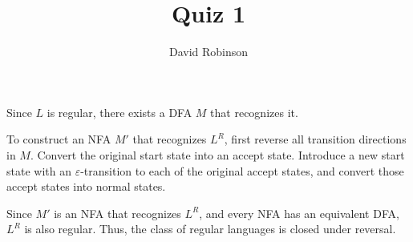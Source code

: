 \documentclass{article}
\title{Quiz 1}
\author{David Robinson}
\date{}
\begin{document}
\maketitle

Since $L$ is regular, there exists a DFA $M$ that recognizes it.
\vspace{1em}

To construct an NFA $M'$ that recognizes $L^R$, first reverse all transition directions in $M$. Convert the original start state into an accept state. Introduce a new start state with an $\varepsilon$-transition to each of the original accept states, and convert those accept states into normal states.
\vspace{1em}

Since $M'$ is an NFA that recognizes $L^R$, and every NFA has an equivalent DFA, $L^R$ is also regular. Thus, the class of regular languages is closed under reversal.
\end{document}
